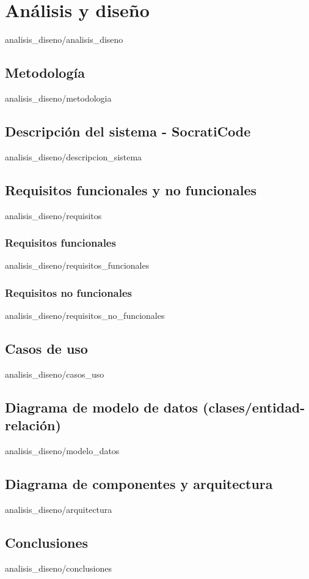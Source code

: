 \documentclass[epsbased,copyright,final,printable,covers,extendedindex,firstnumbered,tfg,gnuplot,lof,lot,loc]{tfgtfmthesisuam}
\begin{document}
\chapter{Análisis y diseño\label{CAP:ANALISIS_DISENO}}{analisis_diseno/analisis_diseno}
  \section{Metodología\label{SEC:AD_METODOLOGIA}}{analisis_diseno/metodologia}
  \section{Descripción del sistema - SocratiCode\label{SEC:AD_DESCRIPCION}}{analisis_diseno/descripcion_sistema}
  \section{Requisitos funcionales y no funcionales\label{SEC:AD_REQUISITOS}}{analisis_diseno/requisitos}
    \subsection{Requisitos funcionales\label{SS:AD_REQ_FUNCIONALES}}{analisis_diseno/requisitos_funcionales}
    \subsection{Requisitos no funcionales\label{SS:AD_REQ_NOFUNCIONALES}}{analisis_diseno/requisitos_no_funcionales}
  \section{Casos de uso\label{SEC:AD_CASOSUSO}}{analisis_diseno/casos_uso}
  \section{Diagrama de modelo de datos (clases/entidad-relación)\label{SEC:AD_MODELO}}{analisis_diseno/modelo_datos}
  \section{Diagrama de componentes y arquitectura\label{SEC:AD_ARQ}}{analisis_diseno/arquitectura}
  \section{Conclusiones\label{SEC:AD_CONCLUSIONES}}{analisis_diseno/conclusiones}
\end{document}
